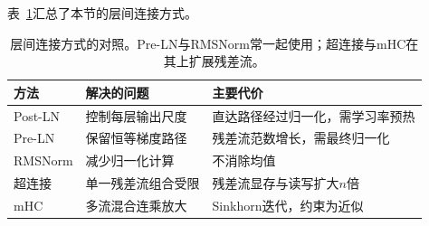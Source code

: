 表~\ref{tab:nlp-llm-layer-composition}汇总了本节的层间连接方式。

\begin{table}[htbp]
 \begin{tabularx}{\linewidth}{@{}p{16mm}p{22mm}X@{}}
  \toprule
  方法 & 解决的问题 & 主要代价\\
  \midrule
  Post-LN & 控制每层输出尺度 & 直达路径经过归一化，需学习率预热\\
  Pre-LN & 保留恒等梯度路径 & 残差流范数增长，需最终归一化\\
  RMSNorm & 减少归一化计算 & 不消除均值\\
  超连接 & 单一残差流组合受限 & 残差流显存与读写扩大$n$倍\\
  mHC & 多流混合连乘放大 & Sinkhorn迭代，约束为近似\\
  \bottomrule
 \end{tabularx}
 \caption{层间连接方式的对照。Pre-LN与RMSNorm常一起使用；超连接与mHC在其上扩展残差流。}
 \label{tab:nlp-llm-layer-composition}
\end{table}
